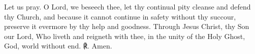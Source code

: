 \begin{enpars} \noindent  Let us pray. O Lord, we beseech thee, let thy continual pity cleanse and defend thy Church, and because it cannot continue in safety without thy succour, preserve it evermore by thy help and goodness. Through Jesus Christ, thy Son our Lord, Who liveth and reigneth with thee, in the unity of the Holy Ghost, God, world without end. ℟. Amen.
\end{enpars}